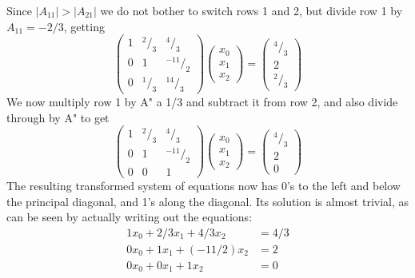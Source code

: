 Since $|A_{11}| > |A_{21}|$ we do not bother to switch rows 1 and 2, but
divide row 1 by $A_{11} =-2/3$, getting
\begin{equation}
    \label{eq:09_19}
    \begin{pmatrix}
        1 & ^2/_3 & ^4/_3\\ 
        0 & 1 & ^{-11}/_2\\ 
        0 & ^1/_3 & ^{14}/_3
    \end{pmatrix}
    \begin{pmatrix}
        x_0\\
        x_1\\
        x_2
    \end{pmatrix}
    =
    \begin{pmatrix}
        ^4/_3\\
        2\\
        ^2/_3
    \end{pmatrix}
\end{equation}
We now multiply row 1 by A" a 1/3 and subtract it from row 2,
and also divide through by A" to get
\begin{equation}
    \label{eq:09_20}
    \begin{pmatrix}
        1 & ^2/_3 & ^4/_3\\ 
        0 & 1 & ^{-11}/_2\\ 
        0 & 0 & 1
    \end{pmatrix}
    \begin{pmatrix}
        x_0\\
        x_1\\
        x_2
    \end{pmatrix}
    =
    \begin{pmatrix}
        ^4/_3\\
        2\\
        0
    \end{pmatrix}
\end{equation}
The resulting transformed system of equations now has 0's to the
left and below the principal diagonal, and 1's along the diagonal.
Its solution is almost trivial, as can be seen by actually writing out
the equations:
\begin{subequations}
    \begin{align}
         \label{eq:09_21_0}
        1 x_0 + 2/3 x_1 + 4/3 x_2 &= 4/3\\
         \label{eq:09_21_1}
        0 x_0 + 1 x_1 + (-11/2) x_2 &= 2 \\
        0 x_0 + 0 x_1 + 1 x_2 &= 0 \label{eq:09_21_2}
    \end{align} 
\end{subequations}
